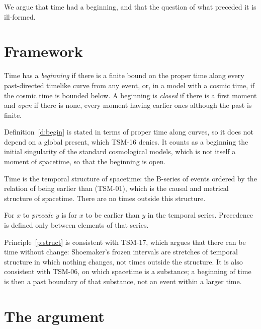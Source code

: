 \documentclass{situationist-preprint}
\begin{document}
We argue that time had a beginning, and that the question of what preceded it is ill-formed.

\section{Framework}

\begin{definition}[Beginning]\label{d:begin}
Time has a \emph{beginning} if there is a finite bound on the proper time along every past-directed timelike curve from any event, or, in a model with a cosmic time, if the cosmic time is bounded below. A beginning is \emph{closed} if there is a first moment and \emph{open} if there is none, every moment having earlier ones although the past is finite.
\end{definition}

Definition~\ref{d:begin} is stated in terms of proper time along curves, so it does not depend on a global present, which TSM-16 denies. It counts as a beginning the initial singularity of the standard cosmological models, which is not itself a moment of spacetime, so that the beginning is open.

\begin{principle}\label{p:struct}
Time is the temporal structure of spacetime: the B-series of events ordered by the relation of being earlier than (TSM-01), which is the causal and metrical structure of spacetime. There are no times outside this structure.
\end{principle}

\begin{principle}[Precedence]\label{p:prec}
For $x$ to \emph{precede} $y$ is for $x$ to be earlier than $y$ in the temporal series. Precedence is defined only between elements of that series.
\end{principle}

Principle~\ref{p:struct} is consistent with TSM-17, which argues that there can be time without change: Shoemaker's frozen intervals are stretches of temporal structure in which nothing changes, not times outside the structure. It is also consistent with TSM-06, on which spacetime is a substance; a beginning of time is then a past boundary of that substance, not an event within a larger time.

\section{The argument}
\end{document}
